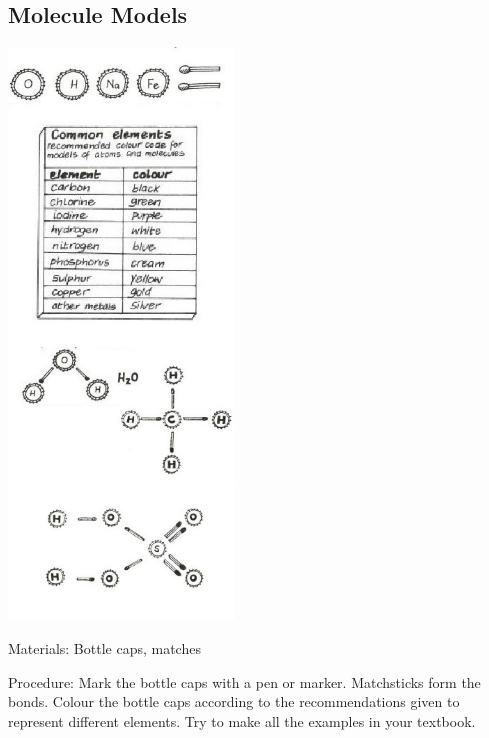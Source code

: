 \begin{multicols}{2}
\subsection{Molecule Models} %

\begin{center}
\includegraphics[width=0.45\textwidth]{./img/vso/molecule-model.jpg}
\end{center}

\begin{description*}
\item[Materials:]{Bottle caps, matches}
\item[Procedure:]{Mark the bottle caps with a pen or marker. Matchsticks form the bonds. Colour the bottle caps according to the recommendations given to represent different elements. Try to make all the examples in your textbook.}
\end{description*}


\end{multicols}
